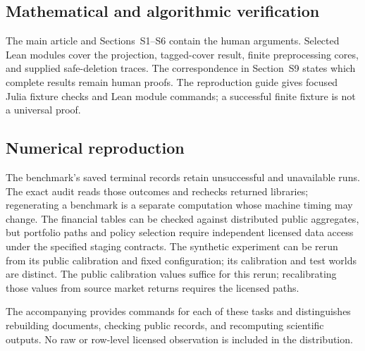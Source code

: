 \subsection{Mathematical and algorithmic verification}

The main article and Sections~S1--S6 contain the human arguments. Selected Lean
modules cover the projection, tagged-cover result, finite preprocessing cores,
and supplied safe-deletion traces. The correspondence in Section~S9 states
which complete results remain human proofs. The reproduction guide gives
focused Julia fixture checks and Lean module commands; a successful finite
fixture is not a universal proof.

\subsection{Numerical reproduction}

The benchmark's saved terminal records retain unsuccessful and unavailable
runs. The exact audit reads those outcomes and rechecks returned libraries;
regenerating a benchmark is a separate computation whose machine timing may
change. The financial tables can be checked against distributed public
aggregates, but portfolio paths and policy selection require independent
licensed data access under the specified staging contracts. The synthetic
experiment can be rerun from its public calibration and fixed configuration;
its calibration and test worlds are distinct. The public calibration values
suffice for this rerun; recalibrating those values from source market returns
requires the licensed paths.

The accompanying  provides commands for each of these tasks
and distinguishes rebuilding documents, checking public records, and
recomputing scientific outputs. No raw or row-level licensed observation is
included in the distribution.
